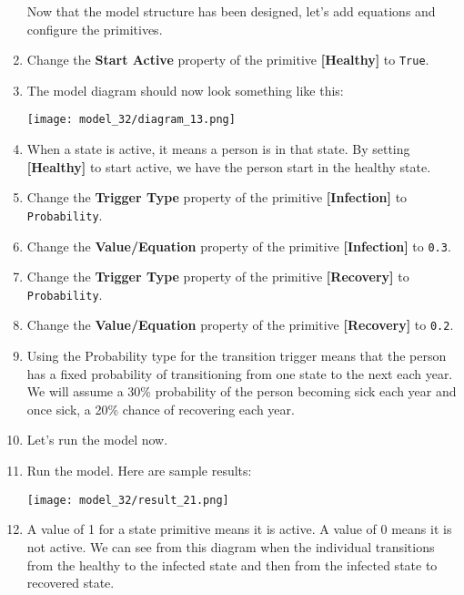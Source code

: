 \documentclass[]{memoir}
\makeatletter
\def\maxwidth{\ifdim\Gin@nat@width>\linewidth\linewidth
\else\Gin@nat@width\fi}
\let\Oldincludegraphics\includegraphics
\renewcommand{\includegraphics}[1]{\Oldincludegraphics[width=\maxwidth]{#1}}
\newcommand{\p}[1]{\textbf{{[}#1{]}}}
\newcommand{\e}[1]{\texttt{#1}}
\renewcommand{\a}[1]{\textbf{#1}}
\makeatother
\begin{document}
\begin{oframed}
\begin{enumerate}
Now that the model structure has been designed, let's add equations and configure the primitives.


\item  Change the \a{Start Active} property of the primitive \p{Healthy} to \e{True}.
\item The model diagram should now look something like this: \par \begin{minipage}{\linewidth}  \centering \texttt{[image: model\_32/diagram\_13.png]}
\end{minipage}
\item 

When a state is active, it means a person is in that state. By setting \p{Healthy} to start active, we have the person start in the healthy state.


\item  Change the \a{Trigger Type} property of the primitive \p{Infection} to \e{Probability}.
\item  Change the \a{Value/Equation} property of the primitive \p{Infection} to \e{0.3}.
\item  Change the \a{Trigger Type} property of the primitive \p{Recovery} to \e{Probability}.
\item  Change the \a{Value/Equation} property of the primitive \p{Recovery} to \e{0.2}.
\item 

Using the Probability type for the transition trigger means that the person has a fixed probability of transitioning from one state to the next each year. We will assume a 30\% probability of the person becoming sick each year and once sick, a 20\% chance of recovering each year.


\item 

Let's run the model now.


\item Run the model. Here are sample results:\par \begin{minipage}{\linewidth}  \centering \texttt{[image: model\_32/result\_21.png]}
\end{minipage}
\item 

A value of 1 for a state primitive means it is active. A value of 0 means it is not active. We can see from this diagram when the individual transitions from the healthy to the infected state and then from the infected state to recovered state.



\end{enumerate}
\end{oframed}
\end{document}
